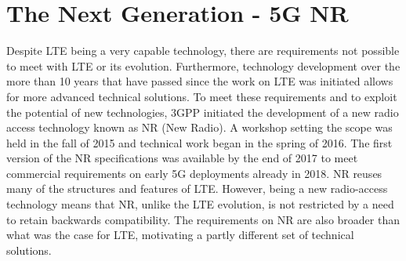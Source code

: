 \section{The Next Generation - 5G NR}
Despite LTE being a very capable technology, there are requirements not possible to meet with LTE or its evolution. Furthermore, technology development over the more than 10 years that have passed since the work on LTE was initiated allows for more advanced technical solutions. To meet these requirements and to exploit the potential of new technologies, 3GPP initiated the development of a new radio access technology known as NR (New Radio). A workshop setting the scope was held in the fall of 2015 and technical work began in the spring of 2016. The first version of the NR specifications was available by the end of 2017 to meet commercial requirements on early 5G deployments already in 2018.
NR reuses many of the structures and features of LTE. However, being a new radio-access technology means that NR, unlike the LTE evolution, is not restricted by a need to retain backwards compatibility. The requirements on NR are also broader than what was the case for LTE, motivating a partly different set of technical solutions.

